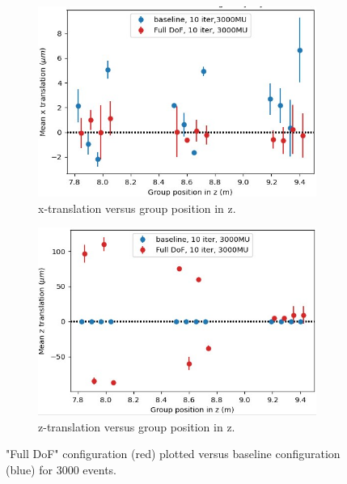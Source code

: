 \begin{figure}
  \centering
  \begin{subfigure}[b]{0.7\textwidth}
    \centering
    \includegraphics[width=\textwidth]{plots/renewed_plots/lxplus/4_7_a.jpeg}
    \caption{x-translation versus group position in z.}
    \label{fig:june_4_1}
  \end{subfigure}
  \hfill
  \begin{subfigure}[b]{0.7\textwidth}
    \centering
    \includegraphics[width=\textwidth]{plots/renewed_plots/lxplus/4_7_b.jpeg}
    \caption{z-translation versus group position in z.}
    \label{fig:june_4_2}
  \end{subfigure}
  \caption{"Full DoF" configuration (red) plotted versus baseline configuration (blue) for 3000 events.}
  \label{fig:june_4}
\end{figure}

